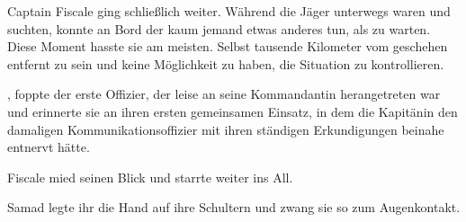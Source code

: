 Captain Fiscale ging schließlich weiter. Während die Jäger unterwegs waren und suchten, konnte an Bord der  kaum jemand etwas anderes tun, als zu warten. Diese Moment hasste sie am meisten. Selbst tausende Kilometer vom geschehen entfernt zu sein und keine Möglichkeit zu haben, die Situation zu kontrollieren.

\par

, foppte der erste Offizier, der leise an seine Kommandantin herangetreten war und erinnerte sie an ihren ersten gemeinsamen Einsatz, in dem die Kapitänin den damaligen Kommunikationsoffizier mit ihren ständigen Erkundigungen beinahe entnervt hätte.

\par

Fiscale mied seinen Blick und starrte weiter ins All. 

\par

 Samad legte ihr die Hand auf ihre Schultern und zwang sie so zum Augenkontakt. 
